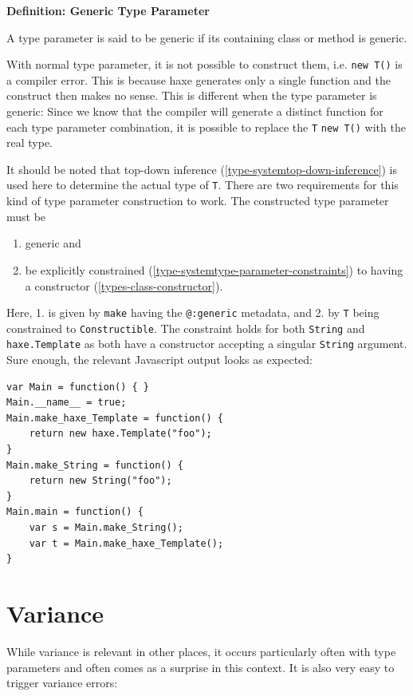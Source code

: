 \documentclass[a4paper,oneside]{book}
\newcommand{\target}[1]{#1}
\newcommand{\type}[1]{\texttt{#1}}
\newcommand{\expr}[1]{\texttt{#1}}
\newenvironment{myshaded}
  {\def\FrameCommand{\fboxsep=\topsep\colorbox{bgcolor}}%
  \MakeFramed {\advance\hsize-\width \FrameRestore}}%
 {\endMakeFramed}
\newcommand{\define}[3][Definition]
	{\begin{myshaded}\noindent\textbf{#1: #2}\par\nobreak\noindent\ignorespaces#3\label{def:#2}\end{myshaded}}
\newcommand{\tref}[2]{#1 (\ref{#2})}
\newcommand{\haxe}[2][]{%
}
\begin{document}
\define{Generic Type Parameter}{A type parameter is said to be generic if its containing class or method is generic.}

With normal type parameter, it is not possible to construct them, i.e. \expr{new T()} is a compiler error. This is because haxe generates only a single function and the construct then makes no sense. This is different when the type parameter is generic: Since we know that the compiler will generate a distinct function for each type parameter combination, it is possible to replace the \type{T} \expr{new T()} with the real type.

\haxe{assets/GenericTypeParameter.hx} 

It should be noted that \tref{top-down inference}{type-systemtop-down-inference} is used here to determine the actual type of \type{T}. There are two requirements for this kind of type parameter construction to work. The constructed type parameter must be

\begin{enumerate}
	\item generic and
	\item be explicitly \tref{constrained}{type-systemtype-parameter-constraints} to having a \tref{constructor}{types-class-constructor}.
\end{enumerate}

Here, 1. is given by \expr{make} having the \expr{@:generic} metadata, and 2. by \type{T} being constrained to \type{Constructible}. The constraint holds for both \type{String} and \type{haxe.Template} as both have a constructor accepting a singular \type{String} argument. Sure enough, the relevant \target{Javascript} output looks as expected:

\begin{lstlisting}
var Main = function() { }
Main.__name__ = true;
Main.make_haxe_Template = function() {
	return new haxe.Template("foo");
}
Main.make_String = function() {
	return new String("foo");
}
Main.main = function() {
	var s = Main.make_String();
	var t = Main.make_haxe_Template();
}
\end{lstlisting}

\section{Variance}
\label{type-systemvariance}

While variance is relevant in other places, it occurs particularly often with type parameters and often comes as a surprise in this context. It is also very easy to trigger variance errors:
\end{document}

